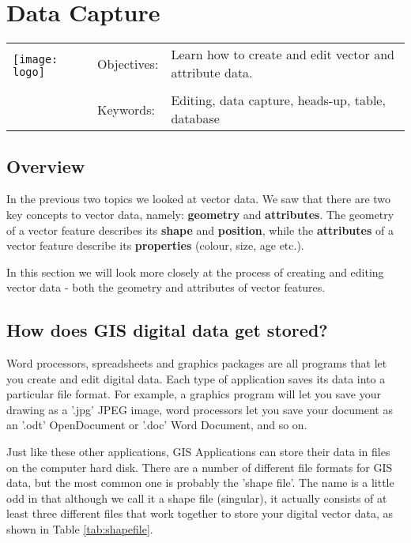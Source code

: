 

\section{Data Capture}\label{sec:datacapture}
\begin{tabular}{p{3.5cm}p{6cm}p{6cm}}
\multirow{2}{*}{\texttt{[image: logo]}} & Objectives: &
Learn how to create and edit vector and attribute data. \\
& & \\
& Keywords: & 
Editing, data capture, heads-up, table, database  \\
\hline
\end{tabular}

\subsection{Overview}

In the previous two topics we looked at vector data. We saw that there are
two key concepts to vector data, namely: \textbf{geometry} and
\textbf{attributes}. The
geometry of a vector feature describes its \textbf{shape} and
\textbf{position}, while the
\textbf{attributes} of a vector feature describe its \textbf{properties}
(colour, size, age etc.).

In this section we will look more closely at the process of creating and
editing vector data - both the geometry and attributes of vector features.

\subsection{How does GIS digital data get stored?}

Word processors, spreadsheets and graphics packages are all programs that let
you create and edit digital data. Each type of application saves its data
into a particular file format. For example, a graphics program will let you
save your drawing as a '.jpg' JPEG image, word processors let you save your
document as an '.odt' OpenDocument or '.doc' Word Document, and so on.

Just like these other applications, GIS Applications can store their data in
files on the computer hard disk. There are a number of different file formats
for GIS data, but the most common one is probably the 'shape file'. The name
is a little odd in that although we call it a shape file (singular), it
actually consists of at least three different files that work together to
store your digital vector data, as shown in Table \ref{tab:shapefile}. 

